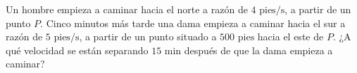 \item Un hombre empieza a caminar hacia el norte a razón de $4 \text{ pies/s}$, a partir de un punto $P$. Cinco minutos más tarde una dama empieza a caminar hacia el sur a razón de $5 \text{ pies/s}$, a partir de un punto situado a $500 \text{ pies}$ hacia el este de $P$. ¿A qué velocidad se están separando $15 \text{ min}$ después de que la dama empieza a caminar?
